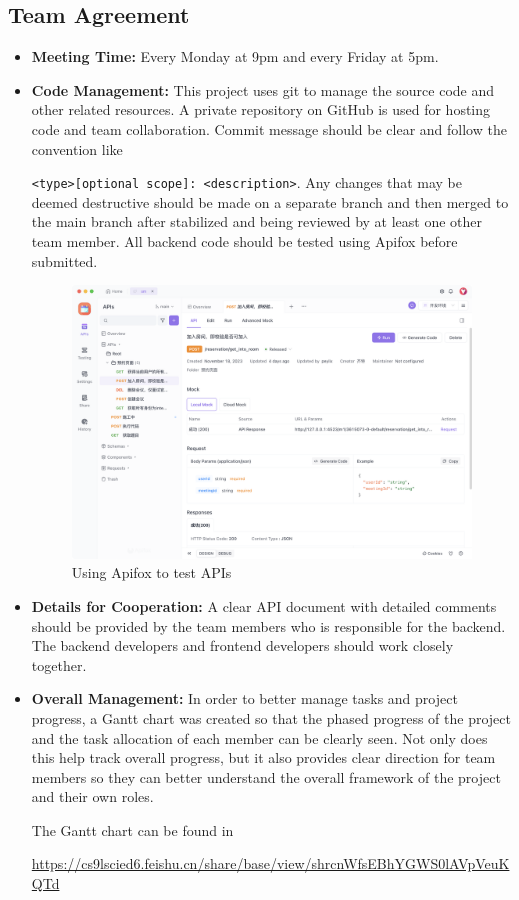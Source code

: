 \documentclass{article}
\begin{document}
\subsection{Team Agreement}
\begin{itemize}
  \item \textbf{Meeting Time:} Every Monday at 9pm and every Friday at 5pm.
  \item \textbf{Code Management:} This project uses git to manage the source code and other related resources. 
  A private repository on GitHub is used for hosting code and team collaboration. Commit message should be 
  clear and follow the convention like \par \verb|<type>[optional scope]: <description>|. Any changes that may be 
  deemed destructive should be made on a separate branch and then merged to the main branch after stabilized 
  and being reviewed by at least one other team member. All backend code should be tested using Apifox before 
  submitted.
  \begin{figure}[H]
    \center
    \includegraphics[scale=0.15]{diagrams/apifox.png}
    \caption{Using Apifox to test APIs}
  \end{figure}
  \item \textbf{Details for Cooperation:} A clear API document with detailed comments should be provided by the 
  team members who is responsible for the backend. The backend developers and frontend developers should work 
  closely together.
  \item \textbf{Overall Management:} In order to better manage tasks and project progress, a Gantt chart was 
  created so that the phased progress of the project and the task allocation of each member can be clearly seen. 
  Not only does this help track overall progress, but it also provides clear direction for team members so they can 
  better understand the overall framework of the project and their own roles.

  The Gantt chart can be found in 
  
  \url{https://cs9lscied6.feishu.cn/share/base/view/shrcnWfsEBhYGWS0lAVpVeuKQTd}
\end{itemize}
\end{document}
